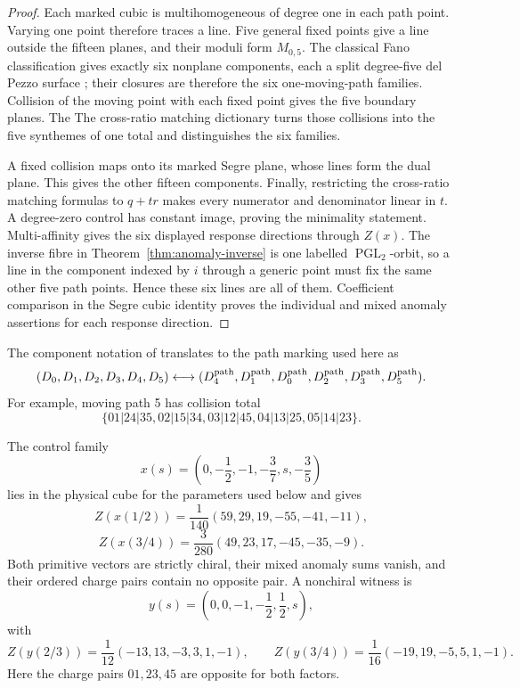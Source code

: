 \documentclass[11pt]{article}
\theoremstyle{definition}
\theoremstyle{remark}
\begin{document}
\begin{proof}
Each marked cubic is multihomogeneous of degree one in each path point.
Varying one point therefore traces a line.  Five general fixed points give
a line outside the fifteen planes, and their moduli form \(M_{0,5}\).
The classical Fano classification gives exactly six nonplane components,
each a split degree-five del Pezzo surface \cite{GripaiosNguyenTwo}; their
closures are therefore the six one-moving-path families.  Collision of the
moving point with each fixed point gives the five boundary planes.  The
The cross-ratio matching dictionary turns those collisions into the five synthemes
of one total and distinguishes the six families.

A fixed collision maps onto its marked Segre plane, whose lines form the
dual plane.  This gives the other fifteen components.  Finally, restricting
the cross-ratio matching formulas to \(q+tr\) makes every numerator and denominator
linear in \(t\).  A degree-zero control has constant image, proving the
minimality statement.  Multi-affinity gives the six displayed response
directions through \(Z(x)\).  The inverse fibre in
Theorem~\ref{thm:anomaly-inverse} is one labelled
\(\operatorname{PGL}_2\)-orbit, so a line in the component indexed by \(i\)
through a generic point must fix the same other five path points.  Hence
these six lines are all of them.  Coefficient comparison in the Segre cubic
identity proves the individual and mixed anomaly assertions for each
response direction.
\end{proof}

The component notation of \cite{GripaiosNguyenTwo} translates to the path
marking used here as
\[
 (D_0,D_1,D_2,D_3,D_4,D_5)
 \longleftrightarrow
 (D^{\rm path}_4,D^{\rm path}_1,D^{\rm path}_0,
  D^{\rm path}_2,D^{\rm path}_3,D^{\rm path}_5).
\]
For example, moving path 5 has collision total
\[
 \{01|24|35,02|15|34,03|12|45,04|13|25,05|14|23\}.
\]

The control family
\[
 x(s)=\left(0,-\frac12,-1,-\frac37,s,-\frac35\right)
\]
lies in the physical cube for the parameters used below and gives
\[
 Z(x(1/2))=\frac1{140}(59,29,19,-55,-41,-11),
\]
\[
 Z(x(3/4))=\frac3{280}(49,23,17,-45,-35,-9).
\]
Both primitive vectors are strictly chiral, their mixed anomaly sums
vanish, and their ordered charge pairs contain no opposite pair.  A
nonchiral witness is
\[
 y(s)=\left(0,0,-1,-\frac12,\frac12,s\right),
\]
with
\[
 Z(y(2/3))=\frac1{12}(-13,13,-3,3,1,-1),\qquad
 Z(y(3/4))=\frac1{16}(-19,19,-5,5,1,-1).
\]
Here the charge pairs \(01,23,45\) are opposite for both factors.
\end{document}
